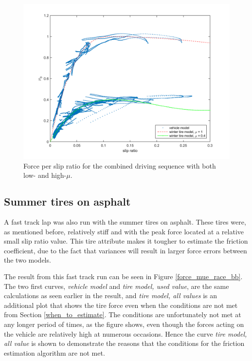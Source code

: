 \begin{figure}[h]
	\centering
	\includegraphics[width=1.0\textwidth]{Pictures/slip_kraft_comb2}
	\caption {Force per slip ratio for the combined driving sequence with both low- and high-$ \mu $.}
	\label{slip_kraft_comb2}
\end{figure}

\subsection{Summer tires on asphalt}
A fast track lap was also run with the summer tires on asphalt. These tires were, as mentioned before, relatively stiff and with the peak force located at a relative small slip ratio value. This tire attribute makes it tougher to estimate the friction coefficient, due to the fact that variances will result in larger force errors between the two models.

The result from this fast track run can be seen in Figure \ref{force_mue_race_bb}. The two first curves, \textit{vehicle model} and \textit{tire model, used value}, are the same calculations as seen earlier in the result, and \textit{tire model, all values} is an additional plot that shows the tire force even when the conditions are not met from Section \ref{when_to_estimate}. The conditions are unfortunately not met at any longer period of times, as the figure shows, even though the forces acting on the vehicle are relatively high at numerous occasions. Hence the curve \textit{tire model, all value} is shown to demonstrate the reasons that the conditions for the friction estimation algorithm are not met.

